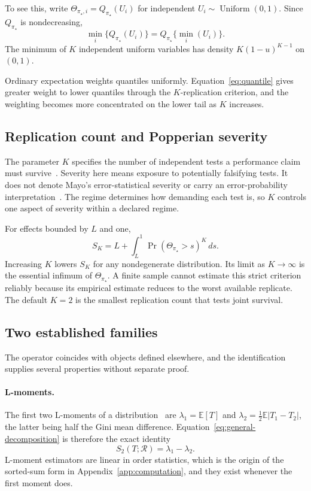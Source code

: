 \documentclass[11pt]{article}
\newcommand{\Regime}{\mathcal{R}}
\newcommand{\E}{\mathbb{E}}
\theoremstyle{remark}
\begin{document}
To see this, write $\Theta_{\pi_\star,i}=Q_{\pi_\star}(U_i)$ for independent $U_i\sim\operatorname{Uniform}(0,1)$. Since $Q_{\pi_\star}$ is nondecreasing,
\[
\min_i\{Q_{\pi_\star}(U_i)\}
=
Q_{\pi_\star}\{\min_i(U_i)\}.
\]
The minimum of $K$ independent uniform variables has density $K(1-u)^{K-1}$ on $(0,1)$.

Ordinary expectation weights quantiles uniformly. Equation~\eqref{eq:quantile} gives greater weight to lower quantiles through the $K$-replication criterion, and the weighting becomes more concentrated on the lower tail as $K$ increases.

\subsection{Replication count and Popperian severity}

The parameter $K$ specifies the number of independent tests a performance claim must survive~\cite{popper1959logic}. Severity here means exposure to potentially falsifying tests. It does not denote Mayo's error-statistical severity or carry an error-probability interpretation~\cite{mayo1996error}. The regime determines how demanding each test is, so $K$ controls one aspect of severity within a declared regime.

For effects bounded by $L$ and one,
\[
S_K
=
L+\int_L^1\Pr(\Theta_{\pi_\star}>s)^K\,ds .
\]
Increasing $K$ lowers $S_K$ for any nondegenerate distribution. Its limit as $K\to\infty$ is the essential infimum of $\Theta_{\pi_\star}$. A finite sample cannot estimate this strict criterion reliably because its empirical estimate reduces to the worst available replicate. The default $K=2$ is the smallest replication count that tests joint survival.

\subsection{Two established families}
\label{app:families}

The operator coincides with objects defined elsewhere, and the identification supplies several properties without separate proof.

\paragraph{L-moments.}
The first two L-moments of a distribution~\cite{hosking1990lmoments} are $\lambda_1=\E[T]$ and $\lambda_2=\tfrac12\E|T_1-T_2|$, the latter being half the Gini mean difference. Equation~\eqref{eq:general-decomposition} is therefore the exact identity
\[
S_2(T;\Regime)=\lambda_1-\lambda_2 .
\]
L-moment estimators are linear in order statistics, which is the origin of the sorted-sum form in Appendix~\ref{app:computation}, and they exist whenever the first moment does.
\end{document}
